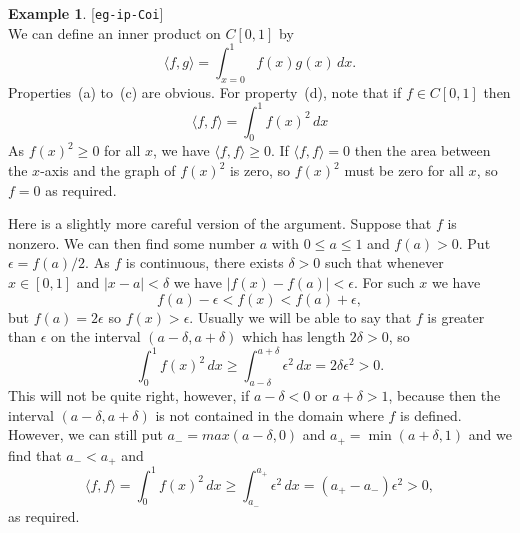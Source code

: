 \documentclass{amsart}
\newcommand{\lbl}[1]{\label{#1}\textup{[\texttt{#1}]}\ \\}
\newcommand{\lbl}{\label}
\newcommand{\dl}        {\delta}
\newcommand{\ep}        {\epsilon}
\newcommand{\ip}[1]     {\langle #1\rangle}
\renewcommand{\:}       {\colon}
\theoremstyle{definition}
\newtheorem{example}[theorem]{Example}
\begin{document}
\begin{example}\lbl{eg-ip-Coi}
 We can define an inner product on $C[0,1]$ by 
 \[ \ip{f,g} = \int_{x=0}^1 f(x) g(x)\, dx. \]
 Properties~(a) to~(c) are obvious.  For property~(d), note
 that if $f\in C[0,1]$ then
 \[ \ip{f,f} = \int_0^1 f(x)^2\,dx \]
 As $f(x)^2\geq 0$ for all $x$, we have $\ip{f,f}\geq 0$.
 If $\ip{f,f}=0$ then the area between the $x$-axis and the
 graph of $f(x)^2$ is zero, so $f(x)^2$ must be zero for all
 $x$, so $f=0$ as required.

 Here is a slightly more careful version of the argument.
 Suppose that $f$ is nonzero.  We can then find some number
 $a$ with $0\leq a\leq 1$ and $f(a)>0$.  Put $\ep=f(a)/2$.
 As $f$ is continuous, there exists $\dl>0$ such that
 whenever $x\in[0,1]$ and $|x-a|<\dl$ we have
 $|f(x)-f(a)|<\ep$.  For such $x$ we have 
 \[ f(a)-\ep < f(x) < f(a)+\ep, \]
 but $f(a)=2\ep$ so $f(x)>\ep$.  Usually we will be able to
 say that $f$ is greater than $\ep$ on the interval
 $(a-\dl,a+\dl)$ which has length $2\dl>0$, so
 \[ \int_0^1 f(x)^2\,dx \geq
    \int_{a-\dl}^{a+\dl} \ep^2 \,dx = 2\dl\ep^2 > 0.
 \]
 This will not be quite right, however, if $a-\dl<0$ or
 $a+\dl>1$, because then the interval $(a-\dl,a+\dl)$ is not
 contained in the domain where $f$ is defined.  However, we
 can still put $a_-=max(a-\dl,0)$ and $a_+=\min(a+\dl,1)$
 and we find that $a_-<a_+$ and 
 \[ \ip{f,f} = \int_0^1 f(x)^2\,dx \geq
    \int_{a_-}^{a_+} \ep^2 \,dx = (a_+-a_-)\ep^2 > 0,
 \]
 as required.
\end{example}
\end{document}
